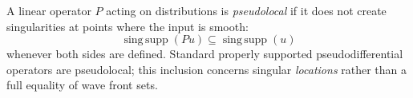 
A linear operator $P$ acting on distributions is \emph{pseudolocal} if it does not create singularities at points where the input is smooth:
\[
\operatorname{sing\,supp}(Pu)\subseteq\operatorname{sing\,supp}(u)
\]
whenever both sides are defined. Standard properly supported pseudodifferential operators are pseudolocal; this inclusion concerns singular \emph{locations} rather than a full equality of wave front sets.
